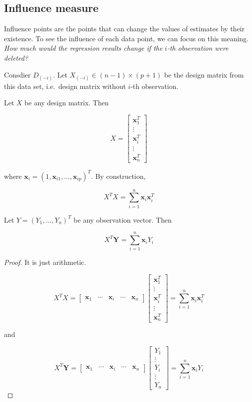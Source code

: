 \documentclass[]{book}
\theoremstyle{definition}
\theoremstyle{definition}
\theoremstyle{definition}
\theoremstyle{remark}
\let\BeginKnitrBlock\begin \let\EndKnitrBlock\end
\begin{document}
\hypertarget{influence-measure}{%
\subsection{Influence measure}\label{influence-measure}}

Influence points are the points that can change the values of estimates by their existence. To see the influence of each data point, we can focus on this meaning. \emph{How much would the regression results change if the} \(i\)\emph{-th observation were deleted?}

Consdier \(D_{(-i)}\). Let \(X_{(-i)} \in (n - 1) \times (p + 1)\) be the design matrix from this data set, i.e.~design matrix without \(i\)-th observation.

\BeginKnitrBlock{lemma}
\protect\hypertarget{lem:xtranx}{}{\label{lem:xtranx} }Let \(X\) be any design matrix. Then

\[
X = \begin{bmatrix}
  \mathbf{x}_1^T \\
  \vdots \\
  \mathbf{x}_i^T \\
  \vdots \\
  \mathbf{x}_n^T
\end{bmatrix}
\]

where \(\mathbf{x}_i = (1, \mathbf{x}_{i1}, \ldots, \mathbf{x}_{ip})^T\). By construction,

\[X^T X = \sum_{i = 1}^n \mathbf{x}_i \mathbf{x}_i^T\]

Let \(Y = (Y_1, \ldots, Y_n)^T\) be any observation vector. Then

\[X^T \mathbf{Y} = \sum_{i = 1}^n \mathbf{x}_i Y_i\]
\EndKnitrBlock{lemma}

\BeginKnitrBlock{proof}
{}It is just arithmetic.

\[
X^TX = \begin{bmatrix}
  \mathbf{x}_1 & \cdots & \mathbf{x}_i & \cdots & \mathbf{x}_n
\end{bmatrix} \begin{bmatrix}
  \mathbf{x}_1^T \\
  \vdots \\
  \mathbf{x}_i^T \\
  \vdots \\
  \mathbf{x}_n^T
\end{bmatrix} = \sum_{i = 1}^n \mathbf{x}_i \mathbf{x}_i^T
\]

and

\[
X^T \mathbf{Y} = \begin{bmatrix}
  \mathbf{x}_1 & \cdots & \mathbf{x}_i & \cdots & \mathbf{x}_n
\end{bmatrix} \begin{bmatrix}
  Y_1 \\
  \vdots \\
  Y_i \\
  \vdots \\
  Y_n
\end{bmatrix} = \sum_{i = 1}^n \mathbf{x}_i Y_i
\]
\EndKnitrBlock{proof}
\end{document}
